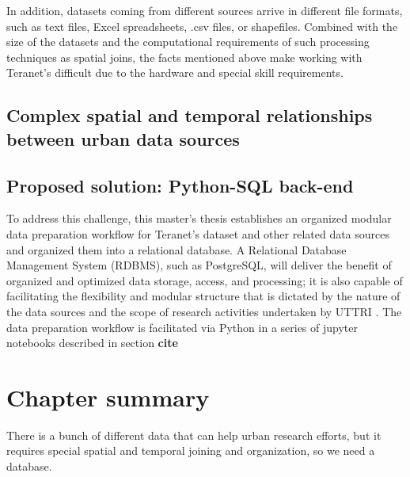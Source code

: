 In addition, datasets coming from different sources arrive in different file formats, such as text files, Excel spreadsheets, .csv files, or shapefiles.
Combined with the size of the datasets and the computational requirements of such processing techniques as spatial joins, the facts mentioned above make working with Teranet's difficult due to the hardware and special skill requirements.

\subsection{Complex spatial and temporal relationships between urban data sources} \label{subsec:complex_spatio-temporal_relationships_between_urban_data_sources}


\subsection{Proposed solution: Python-SQL back-end} \label{subsec:proposed_solution_python_sql_backend}

To address this challenge, this master's thesis establishes an organized modular data preparation workflow for Teranet's dataset and other related data sources and organized them into a relational database.
A Relational Database Management System (RDBMS), such as PostgreSQL, will deliver the benefit of organized and optimized data storage, access, and processing;
it is also capable of facilitating the flexibility and modular structure that is dictated by the nature of the data sources and the scope of research activities undertaken by UTTRI .
The data preparation workflow is facilitated via Python in a series of jupyter notebooks described in section \textbf{cite}

\section{Chapter summary} \label{sec:background_summary}
There is a bunch of different data that can help urban research efforts, but it requires special spatial and temporal joining and organization, so we need a database.
